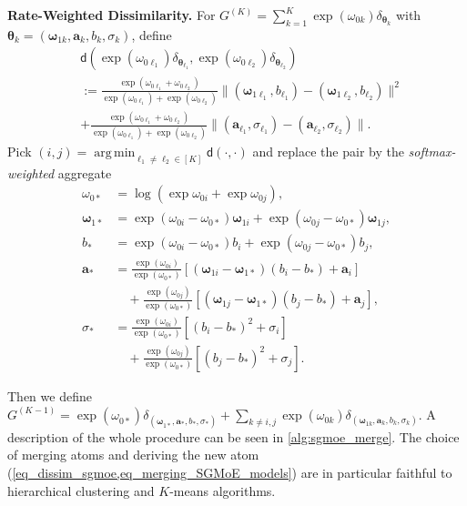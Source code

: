 \documentclass[twoside]{article}
\newcommand{\divclus}{\mathsf{d}}
\theoremstyle{plain}
\theoremstyle{definition}
\theoremstyle{plain}
\def\vtheta{{\bm{\theta}}}
\def\vomega{{\bm{\omega}}}
\def\va{{\bm{a}}}
\DeclareMathOperator*{\argmin}{arg\,min}
\begin{document}
{\bf Rate-Weighted Dissimilarity.}
For $G^{(K)}=\sum_{k=1}^K \exp(\omega_{0k})\delta_{\vtheta_k}$ with $\vtheta_k=(\vomega_{1k},\va_k,b_k,\sigma_k)$, define
\begin{align}
&\divclus\!\left(\exp(\omega_{0\ell_1})\delta_{\vtheta_{\ell_1}},
\exp(\omega_{0\ell_2})\delta_{\vtheta_{\ell_2}}\right)\nonumber\\
&:=\frac{\exp(\omega_{0\ell_1}+\omega_{0\ell_2})}{\exp(\omega_{0\ell_1})+\exp(\omega_{0\ell_2})}
\|(\vomega_{1\ell_1},b_{\ell_1})-(\vomega_{1\ell_2},b_{\ell_2})\|^2
 \nonumber \\
 & + \frac{\exp(\omega_{0\ell_1}+\omega_{0\ell_2})}{\exp(\omega_{0\ell_1})+\exp(\omega_{0\ell_2})}\|(\va_{\ell_1},\sigma_{\ell_1})-(\va_{\ell_2},\sigma_{\ell_2})\|.
\label{eq_dissim_sgmoe}
\end{align}
Pick $(i,j)=\argmin_{\ell_1\neq\ell_2\in[K]}\divclus(\cdot,\cdot)$ and replace the pair by the \emph{softmax-weighted} aggregate
\begin{align}
    \omega_{0*} &= \log \left( \exp{\omega_{0i}} + \exp{\omega_{0j}} \right), \nonumber \\
    \vomega_{1*} &= \exp{\left(\omega_{0i} - \omega_{0*} \right)}\vomega_{1i} + \exp{\left(\omega_{0j} - \omega_{0*}\right)} \vomega_{1j}, \nonumber\\
    b_* &= \exp{\left(\omega_{0i} - \omega_{0*} \right)} b_i + \exp{\left(\omega_{0j} - \omega_{0*}\right)} b_j, \nonumber\\
    \va_* &= \frac{\exp(\omega_{0i})}{\exp(\omega_{0*})} [(\vomega_{1i} - \vomega_{1*}) (b_i - b_*) + \va_i] \nonumber\\
    &\quad+ \frac{\exp(\omega_{0j})}{\exp(\omega_{0*})} [(\vomega_{1j} - \vomega_{1*}) (b_j - b_*) + \va_j], \nonumber \\
    \sigma_* &= \frac{\exp(\omega_{0i})}{\exp(\omega_{0*})} [(b_i - b_*)^2 + \sigma_i] \nonumber\\
    &\quad + \frac{\exp(\omega_{0j})}{\exp(\omega_{0*})} [ (b_j - b_*)^2 + \sigma_j].\label{eq_merging_SGMoE_models}
\end{align}

Then we define $G^{(K - 1)} = \exp(\omega_{0*}^{}) \delta_{(\vomega_{1*}^{}, \va_*, b_*, \sigma_*)} + \sum_{k \ne i, j} \exp(\omega_{0k}^{}) \delta_{(\vomega_{1k}^{}, \va_k, b_k, \sigma_k)}$. A description of the whole procedure can be seen in \cref{alg:sgmoe_merge}. The choice of merging atoms and deriving the new atom (\cref{eq_dissim_sgmoe,eq_merging_SGMoE_models}) are in particular faithful to hierarchical clustering and $K$-means algorithms. 
\end{document}
